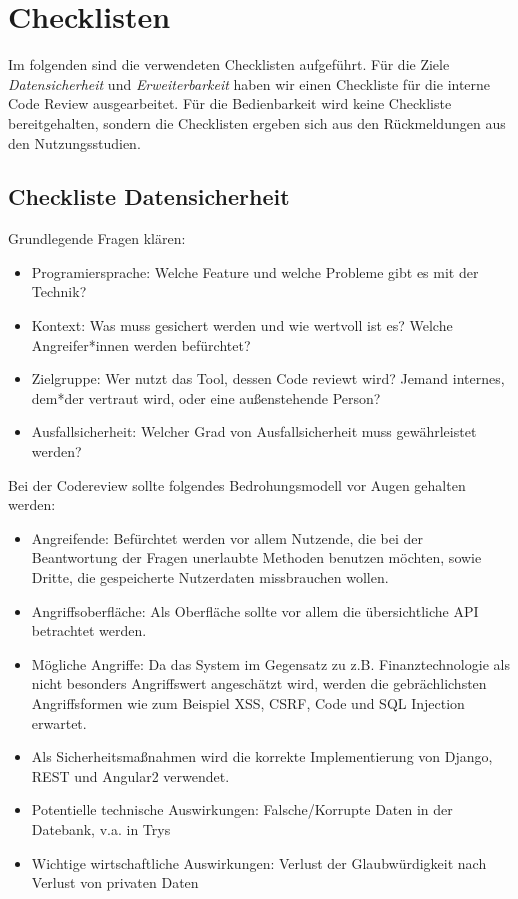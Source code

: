 \documentclass[accentcolor=tud0b,12pt,paper=a4]{tudreport}
\begin{document}
\appendix
\chapter{Checklisten}

Im folgenden sind die verwendeten Checklisten aufgeführt. Für die Ziele \emph{Datensicherheit} und \emph{Erweiterbarkeit} haben wir einen Checkliste für die interne Code Review ausgearbeitet. Für die Bedienbarkeit wird keine Checkliste bereitgehalten, sondern die Checklisten ergeben sich aus den Rückmeldungen aus den Nutzungsstudien.

\section{Checkliste Datensicherheit}

Grundlegende Fragen klären:

\begin{itemize}
    \item Programiersprache: Welche Feature und welche Probleme gibt es mit der Technik?
    \item Kontext: Was muss gesichert werden und wie wertvoll ist es? Welche Angreifer*innen werden befürchtet?
    \item Zielgruppe: Wer nutzt das Tool, dessen Code reviewt wird? Jemand internes, dem*der vertraut wird, oder eine außenstehende Person?
    \item Ausfallsicherheit: Welcher Grad von Ausfallsicherheit muss gewährleistet werden?
\end{itemize}

Bei der Codereview sollte folgendes Bedrohungsmodell vor Augen gehalten werden:

\begin{itemize}
    \item Angreifende: Befürchtet werden vor allem Nutzende, die bei der Beantwortung der Fragen unerlaubte Methoden benutzen möchten, sowie Dritte, die gespeicherte Nutzerdaten missbrauchen wollen.
    \item Angriffsoberfläche: Als Oberfläche sollte vor allem die übersichtliche API betrachtet werden.
    \item Mögliche Angriffe: Da das System im Gegensatz zu z.B. Finanztechnologie als nicht besonders Angriffswert angeschätzt wird, werden die gebrächlichsten Angriffsformen wie zum Beispiel XSS, CSRF, Code und SQL Injection erwartet.
    \item Als Sicherheitsmaßnahmen wird die korrekte Implementierung von Django, REST und Angular2 verwendet.
    \item Potentielle technische Auswirkungen: Falsche/Korrupte Daten in der Datebank, v.a. in Trys
    \item Wichtige wirtschaftliche Auswirkungen: Verlust der Glaubwürdigkeit nach Verlust von privaten Daten
\end{itemize}
\end{document}
